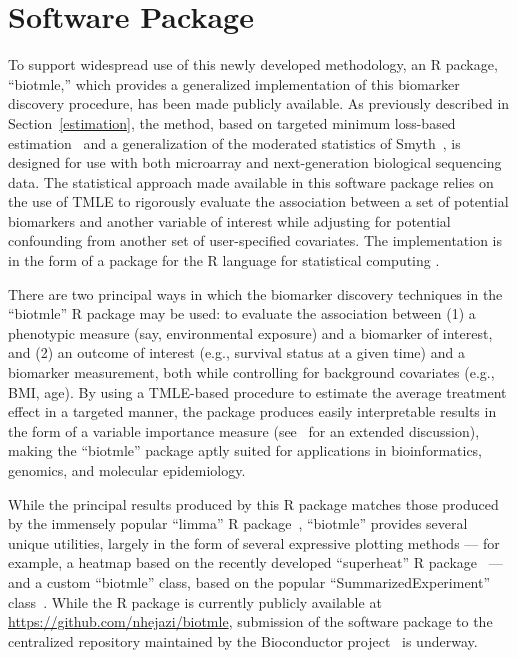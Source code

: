 \chapter{Software Package}

To support widespread use of this newly developed methodology, an R package,
``biotmle,'' which provides a generalized implementation of this biomarker
discovery procedure, has been made publicly available. As previously described
in Section~\ref{estimation}, the method, based on targeted minimum loss-based
estimation~\cite{van2011targeted} and a generalization of the moderated
statistics of Smyth~\cite{smyth2004linear}, is designed for use with both
microarray and next-generation biological sequencing data. The statistical
approach made available in this software package relies on the use of TMLE to
rigorously evaluate the association between a set of potential biomarkers and
another variable of interest while adjusting for potential confounding from
another set of user-specified covariates. The implementation is in the form of a
package for the R language for statistical computing \cite{R}.

There are two principal ways in which the biomarker discovery techniques in
the ``biotmle'' R package may be used: to evaluate the association between (1) a
phenotypic measure (say, environmental exposure) and a biomarker of interest,
and (2) an outcome of interest (e.g., survival status at a given time) and a
biomarker measurement, both while controlling for background covariates (e.g.,
BMI, age). By using a TMLE-based procedure to estimate the average treatment
effect in a targeted manner, the package produces easily interpretable results
in the form of a variable importance measure (see~\cite{van2011targeted} for an
extended discussion), making the ``biotmle'' package aptly suited for
applications in bioinformatics, genomics, and molecular epidemiology.

While the principal results produced by this R package matches those produced by
the immensely popular ``limma'' R package~\cite{smyth2005limma}, ``biotmle''
provides several unique utilities, largely in the form of several expressive
plotting methods --- for example, a heatmap based on the recently developed
``superheat'' R package~\cite{barter2017superheat} --- and a custom ``biotmle''
class, based on the popular ``SummarizedExperiment''
class~\cite{huber2015orchestrating}. While the R package is currently publicly
available at \url{https://github.com/nhejazi/biotmle}, submission of the
software package to the centralized repository maintained by the Bioconductor
project~\cite{gentleman2004bioconductor} is underway.
